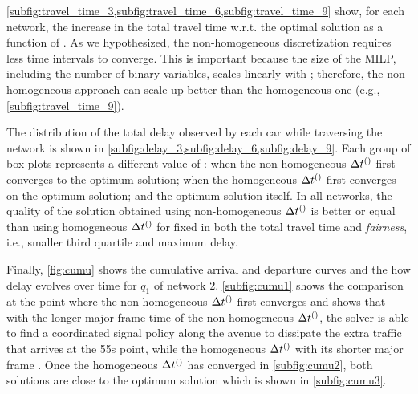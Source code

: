 %
\cref{subfig:travel_time_3,subfig:travel_time_6,subfig:travel_time_9} show, for
each network, the increase in the total travel time w.r.t. the optimal solution
as a function of \Nn.
%
As we hypothesized, the non-homogeneous discretization requires less time
intervals to converge.
%
This is important because the size of the MILP, including the number of binary
variables, scales linearly with \Nn; therefore, the non-homogeneous approach can
scale up better than the homogeneous one (e.g., \cref{subfig:travel_time_9}).


The distribution of the total delay observed by each car while traversing the
network is shown in \cref{subfig:delay_3,subfig:delay_6,subfig:delay_9}.
%
Each group of box plots represents a different value of \Nn: when the
non-homogeneous $\DT[]$ first converges to the optimum solution; when the
homogeneous $\DT[]$ first converges on the optimum solution; and the optimum
solution itself.
%
In all networks, the quality of the solution obtained using non-homogeneous
$\DT[]$ is better or equal than using homogeneous $\DT[]$ for fixed \Nn in both
the total travel time and \emph{fairness}, i.e., smaller third quartile and
maximum delay.



Finally, \cref{fig:cumu} shows the cumulative arrival and departure curves and
the how delay evolves over time for $q_1$ of network 2.  \cref{subfig:cumu1}
shows the comparison at the point where the non-homogeneous $\DT[]$ first
converges and shows that with the longer major frame time of the
non-homogeneous $\DT[]$, the solver is able to find a coordinated signal policy
along the avenue to dissipate the extra traffic that arrives at the 55s point,
while the homogeneous $\DT[]$ with its shorter major frame . Once the homogeneous $\DT[]$ has
converged in \cref{subfig:cumu2}, both solutions are close to the optimum
solution which is shown in \cref{subfig:cumu3}.


